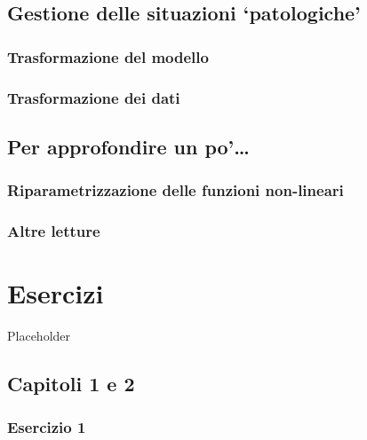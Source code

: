 \documentclass[a4paper,12pt,oneside]{book}
\begin{document}
\hypertarget{gestione-delle-situazioni-patologiche}{%
\section{Gestione delle situazioni `patologiche'}\label{gestione-delle-situazioni-patologiche}}

\hypertarget{trasformazione-del-modello}{%
\subsection{Trasformazione del modello}\label{trasformazione-del-modello}}

\hypertarget{trasformazione-dei-dati}{%
\subsection{Trasformazione dei dati}\label{trasformazione-dei-dati}}

\hypertarget{per-approfondire-un-po-1}{%
\section{Per approfondire un po'\ldots{}}\label{per-approfondire-un-po-1}}

\hypertarget{riparametrizzazione-delle-funzioni-non-lineari}{%
\subsection{Riparametrizzazione delle funzioni non-lineari}\label{riparametrizzazione-delle-funzioni-non-lineari}}

\hypertarget{altre-letture-11}{%
\subsection{Altre letture}\label{altre-letture-11}}

\hypertarget{esercizi}{%
\chapter{Esercizi}\label{esercizi}}

Placeholder

\hypertarget{capitoli-1-e-2}{%
\section{Capitoli 1 e 2}\label{capitoli-1-e-2}}

\hypertarget{esercizio-1}{%
\subsection{Esercizio 1}\label{esercizio-1}}
\end{document}
